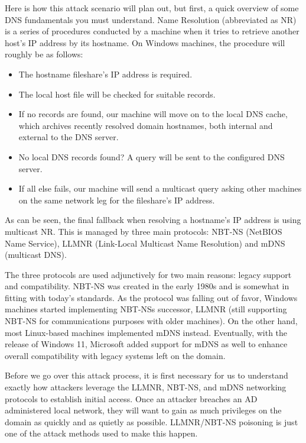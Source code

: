 Here is how this attack scenario will plan out, but first, a quick overview of some DNS fundamentals you must understand. Name Resolution (abbreviated as NR) is a series of procedures conducted by a machine when it tries to retrieve another host's IP address by its hostname. On Windows machines, the procedure will roughly be as follows:
\begin{itemize}
    \item The hostname fileshare's IP address is required.
    \item The local host file will be checked for suitable records.
    \item If no records are found, our machine will move on to the local DNS cache, which archives recently resolved domain hostnames, both internal and external to the DNS server.
    \item No local DNS records found? A query will be sent to the configured DNS server.
    \item If all else fails, our machine will send a multicast query asking other machines on the same network leg for the fileshare's IP address.
\end{itemize}

As can be seen, the final fallback when resolving a hostname's IP address is using multicast NR. This is managed by three main protocols: NBT-NS (NetBIOS Name Service), LLMNR (Link-Local Multicast Name Resolution) and mDNS (multicast DNS).

The three protocols are used adjunctively for two main reasons: legacy support and compatibility. NBT-NS was created in the early 1980s and is somewhat in fitting with today's standards. As the protocol was falling out of favor, Windows machines started implementing NBT-NSs successor, LLMNR (still supporting NBT-NS for communications purposes with older machines). On the other hand, most Linux-based machines implemented mDNS instead. Eventually, with the release of Windows 11, Microsoft added support for mDNS as well to enhance overall compatibility with legacy systems left on the domain.

Before we go over this attack process, it is first necessary for us to understand exactly how attackers leverage the LLMNR, NBT-NS, and mDNS networking protocols to establish initial access. Once an attacker breaches an AD administered local network, they will want to gain as much privileges on the domain as quickly and as quietly as possible. LLMNR/NBT-NS poisoning is just one of the attack methods used to make this happen.

